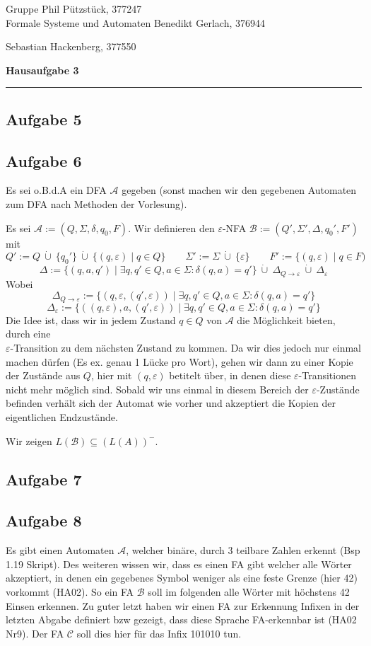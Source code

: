 \documentclass[a4paper,graphics,11pt]{article}
\newcommand{\aufgabe}[1]{\subsection*{Aufgabe #1}}
\begin{document}
\noindent Gruppe              \hfill Phil Pützstück, 377247\\
\noindent Formale Systeme und Automaten \hfill Benedikt Gerlach, 376944\\
\strut\hfill Sebastian Hackenberg, 377550\\
\begin{center}
	\LARGE{\textbf{Hausaufgabe 3}}
\end{center}
\begin{center}
\rule[0.1ex]{\textwidth}{1pt}
\end{center}


\aufgabe{5}
\newpage
\aufgabe{6}
Es sei o.B.d.A ein DFA $\mathcal{A}$ gegeben (sonst machen wir den gegebenen Automaten zum DFA nach Methoden
der Vorlesung).

Es sei $\mathcal{A} := (Q, \Sigma, \delta, q_0, F)$.
Wir definieren den $\varepsilon$-NFA $\mathcal{B} := (Q', \Sigma', \Delta, q_0', F')$ mit
$$
    Q' := Q\ \dot\cup\ \{q_0'\}\ \dot\cup\ \{(q, \varepsilon) \mid q \in Q\}
    \qquad \Sigma' := \Sigma\ \dot\cup\ \{\varepsilon\}
    \qquad F' := \{(q, \varepsilon) \mid q \in F)
$$$$
    \Delta := \{(q, a, q') \mid \exists q,q' \in Q, a \in \Sigma : \delta(q, a) = q'\}\ \dot\cup\ \Delta_{Q \to \varepsilon}\ \dot\cup\ \Delta_\varepsilon
$$
Wobei
$$
    \Delta_{Q \to \varepsilon} := \{(q, \varepsilon, (q', \varepsilon)) \mid \exists q,q' \in Q, a \in \Sigma : \delta(q, a) = q'\}
$$$$
    \Delta_\varepsilon := \{((q, \varepsilon), a, (q', \varepsilon)) \mid \exists q,q' \in Q, a \in \Sigma : \delta(q, a) = q'\}
$$
Die Idee ist, dass wir in jedem Zustand $q \in Q$ von $\mathcal{A}$ die Möglichkeit bieten, durch eine\\
$\varepsilon$-Transition zu dem nächsten Zustand zu kommen. Da wir dies jedoch nur einmal machen dürfen
(Es ex. genau 1 Lücke pro Wort), gehen wir dann zu einer Kopie der Zustände aus $Q$, hier mit $(q, \varepsilon)$
betitelt über, in denen diese $\varepsilon$-Transitionen nicht mehr möglich sind. Sobald wir uns einmal in diesem
Bereich der $\varepsilon$-Zustände befinden verhält sich der Automat wie vorher und akzeptiert die Kopien der 
eigentlichen Endzustände.

Wir zeigen $L(\mathcal{B}) \subseteq (L(A))^-$.

\newpage
\aufgabe{7}
\newpage
\aufgabe{8}
Es gibt einen Automaten $\mathcal{A}$, welcher binäre, durch 3 teilbare Zahlen erkennt (Bsp 1.19 Skript).
Des weiteren wissen wir, dass es einen FA gibt welcher alle Wörter akzeptiert,
in denen ein gegebenes Symbol weniger als eine feste Grenze (hier 42) vorkommt (HA02). So ein FA $\mathcal{B}$
soll im folgenden alle Wörter mit höchstens 42 Einsen erkennen.
Zu guter letzt haben wir einen FA zur Erkennung Infixen in der letzten Abgabe definiert bzw gezeigt, dass diese Sprache FA-erkennbar ist (HA02 Nr9). Der FA $\mathcal{C}$ soll dies hier für das Infix 101010 tun.
\end{document}
